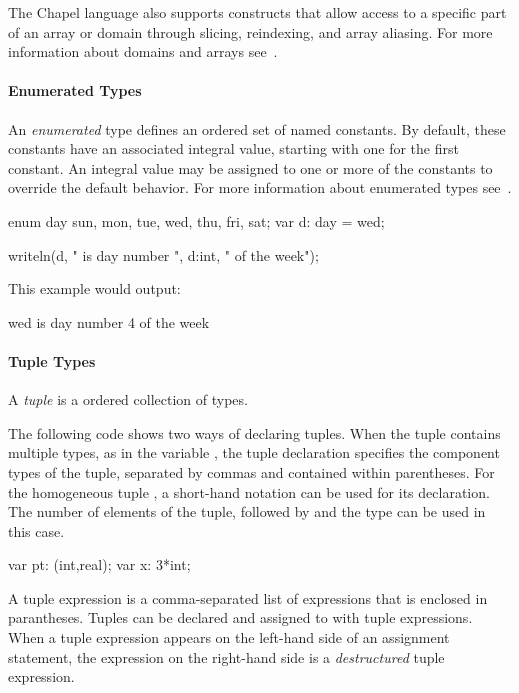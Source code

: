 The Chapel language also supports constructs that allow 
access to a specific part of an array or domain through slicing,
reindexing, and array aliasing.   For more information about 
domains and arrays see~.
 
\paragraph{Enumerated Types}
An \emph{enumerated} type defines an ordered set of named constants.
By default, these constants have an associated 
integral value, starting with one for the first constant. 
An integral value may be assigned to one or more of the constants
to override the default behavior.  For more information about
enumerated types see~.

\begin{example}
\begin{chapel}
enum day {sun, mon, tue, wed, thu, fri, sat};
var d: day = wed;

writeln(d, " is day number ", d:int, " of the week");
\end{chapel}

This example would output:
\begin{commandline}
wed is day number 4 of the week
\end{commandline}
\end{example}

\paragraph{Tuple Types}
A \emph{tuple} is a ordered collection of types.
\begin{example}
The following code shows two ways of declaring tuples.
When the tuple contains multiple types, as in the variable
, the tuple declaration specifies the component
types of the tuple, separated by commas and contained within
parentheses.  For the homogeneous tuple , a short-hand
notation can be used for its declaration.  The number of elements
of the tuple, followed by \chpl{*} and the type can be used in
this case.

\begin{chapel}
var pt: (int,real);
var x: 3*int;
\end{chapel}
\end{example}

A tuple expression is a comma-separated list of expressions that
is enclosed in parantheses.  Tuples can be declared and assigned to with
tuple expressions.  When a tuple expression appears on the
left-hand side of an assignment statement, the expression on the right-hand
side is a \emph{destructured} tuple expression.  

